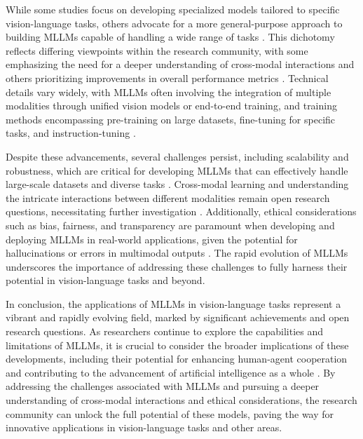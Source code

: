 \documentclass[conference]{IEEEtran}
\begin{document}
While some studies focus on developing specialized models tailored to specific vision-language tasks, others advocate for a more general-purpose approach to building MLLMs capable of handling a wide range of tasks \cite{b7}. This dichotomy reflects differing viewpoints within the research community, with some emphasizing the need for a deeper understanding of cross-modal interactions and others prioritizing improvements in overall performance metrics \cite{b8}. Technical details vary widely, with MLLMs often involving the integration of multiple modalities through unified vision models or end-to-end training, and training methods encompassing pre-training on large datasets, fine-tuning for specific tasks, and instruction-tuning \cite{b9}.

Despite these advancements, several challenges persist, including scalability and robustness, which are critical for developing MLLMs that can effectively handle large-scale datasets and diverse tasks \cite{b10}. Cross-modal learning and understanding the intricate interactions between different modalities remain open research questions, necessitating further investigation \cite{b11}. Additionally, ethical considerations such as bias, fairness, and transparency are paramount when developing and deploying MLLMs in real-world applications, given the potential for hallucinations or errors in multimodal outputs \cite{b12}. The rapid evolution of MLLMs underscores the importance of addressing these challenges to fully harness their potential in vision-language tasks and beyond.

In conclusion, the applications of MLLMs in vision-language tasks represent a vibrant and rapidly evolving field, marked by significant achievements and open research questions. As researchers continue to explore the capabilities and limitations of MLLMs, it is crucial to consider the broader implications of these developments, including their potential for enhancing human-agent cooperation and contributing to the advancement of artificial intelligence as a whole \cite{b13}. By addressing the challenges associated with MLLMs and pursuing a deeper understanding of cross-modal interactions and ethical considerations, the research community can unlock the full potential of these models, paving the way for innovative applications in vision-language tasks and other areas.
\end{document}
